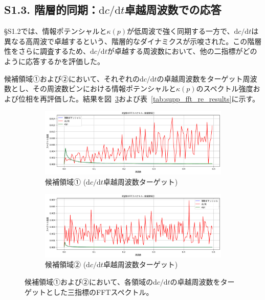 \documentclass[a4paper,12pt]{article}
\begin{document}
\subsection*{S1.3. 階層的同期：$\mathrm{d}c/\mathrm{d}t$卓越周波数での応答}
\label{subsec:supp_hierarchical_sync}

§S1.2では、情報ポテンシャルと$\kappa(p)$が低周波で強く同期する一方で、$\mathrm{d}c/\mathrm{d}t$は異なる高周波で卓越するという、階層的なダイナミクスが示唆された。この階層性をさらに調査するため、$\mathrm{d}c/\mathrm{d}t$が卓越する周波数において、他の二指標がどのように応答するかを評価した。

候補領域①および②において、それぞれの$\mathrm{d}c/\mathrm{d}t$の卓越周波数をターゲット周波数とし、その周波数ビンにおける情報ポテンシャルと$\kappa(p)$のスペクトル強度および位相を再評価した。結果を図~\ref{fig:supp_fft_re_regions}および表~\ref{tab:supp_fft_re_results}に示す。

\begin{figure}[H]
    \centering
    \begin{subfigure}{0.48\linewidth}
        \includegraphics[width=\linewidth]{S1_fft_spectre_seq1.png}
        \caption{候補領域① ($\mathrm{d}c/\mathrm{d}t$卓越周波数ターゲット)}
        \label{fig:supp_fft_region1_re}
    \end{subfigure}
    \hfill
    \begin{subfigure}{0.48\linewidth}
        \includegraphics[width=\linewidth]{S1_fft_spectre_seq2.png}
        \caption{候補領域② ($\mathrm{d}c/\mathrm{d}t$卓越周波数ターゲット)}
        \label{fig:supp_fft_region2_re}
    \end{subfigure}
    \caption{候補領域①および②において、各領域の$\mathrm{d}c/\mathrm{d}t$の卓越周波数をターゲットとした三指標のFFTスペクトル。}
    \label{fig:supp_fft_re_regions}
\end{figure}
\end{document}
